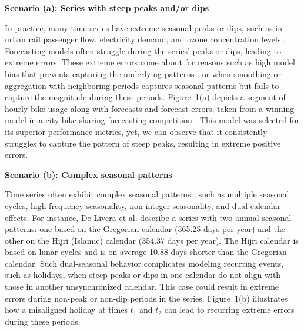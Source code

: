 \documentclass[ijds,sglanonrev]{informs4}
\newenvironment{scenario}[1]{%
  \par\vspace{1ex}\noindent\textbf{#1}\par\vspace{0.5ex}}{\par}
\begin{document}
\begin{scenario}{Scenario (a): Series with steep peaks and/or dips}
In practice, many time series have extreme seasonal peaks or dips, such as in urban rail passenger flow, electricity demand, and ozone concentration levels  \citep{li2024, amaraouali2023, marvin2022}. Forecasting models often struggle during the series' peaks or dips, leading to extreme errors. These extreme errors come about for reasons such as high model bias that prevents capturing the underlying patterns \citep{lin2023}, or when smoothing or aggregation with neighboring periods captures seasonal patterns but fails to capture the magnitude during these periods. Figure~1(a) depicts a segment of hourly bike usage along with forecasts and forecast errors, taken from a winning model in a city bike-sharing forecasting competition \citep{mohit2020}. This model was selected for its superior performance metrics, yet, we can observe that it consistently struggles to capture the pattern of steep peaks, resulting in extreme positive errors.
\end{scenario}

\begin{scenario}{Scenario (b): Complex seasonal patterns}

Time series often exhibit complex seasonal patterns \citep{zhao2024}, such as multiple seasonal cycles, high-frequency seasonality, non-integer seasonality, and dual-calendar effects. For instance, De Livera et al. \cite{delivera2011} describe a series with two annual seasonal patterns: one based on the Gregorian calendar (365.25 days per year) and the other on the Hijri (Islamic) calendar (354.37 days per year). The Hijri calendar is based on lunar cycles and is on average 10.88 days shorter than the Gregorian calendar. Such dual-seasonal behavior complicates modeling recurring events, such as holidays, when steep peaks or dips in one calendar do not align with those in another unsynchronized calendar. This case could result in extreme errors during non-peak or non-dip periods in the series. %
Figure~1(b) illustrates how a misaligned holiday at times $t_1$ and $t_2$ can lead to recurring extreme errors during these periods.
\end{scenario}
\end{document}
